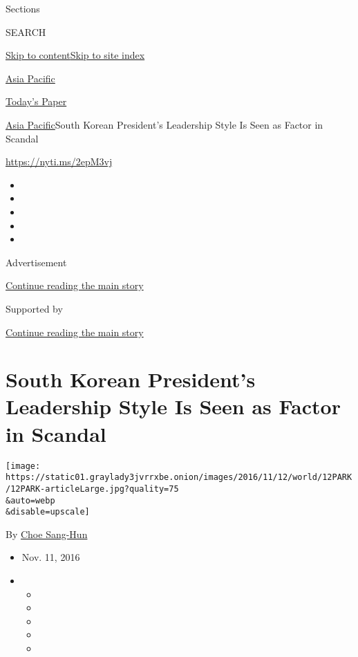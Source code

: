 Sections

SEARCH

\protect\hyperlink{site-content}{Skip to
content}\protect\hyperlink{site-index}{Skip to site index}

\href{https://www.nytimes3xbfgragh.onion/section/world/asia}{Asia
Pacific}

\href{https://myaccount.nytimes3xbfgragh.onion/auth/login?response_type=cookie\&client_id=vi}{}

\href{https://www.nytimes3xbfgragh.onion/section/todayspaper}{Today's
Paper}

\href{/section/world/asia}{Asia Pacific}\textbar{}South Korean
President's Leadership Style Is Seen as Factor in Scandal

\url{https://nyti.ms/2epM3vj}

\begin{itemize}
\item
\item
\item
\item
\item
\end{itemize}

Advertisement

\protect\hyperlink{after-top}{Continue reading the main story}

Supported by

\protect\hyperlink{after-sponsor}{Continue reading the main story}

\hypertarget{south-korean-presidents-leadership-style-is-seen-as-factor-in-scandal}{%
\section{South Korean President's Leadership Style Is Seen as Factor in
Scandal}\label{south-korean-presidents-leadership-style-is-seen-as-factor-in-scandal}}

\texttt{[image: https://static01.graylady3jvrrxbe.onion/images/2016/11/12/world/12PARK/12PARK-articleLarge.jpg?quality=75\\\&auto=webp\\\&disable=upscale]}

By \href{http://www.nytimes3xbfgragh.onion/by/choe-sang-hun}{Choe
Sang-Hun}

\begin{itemize}
\item
  Nov. 11, 2016
\item
  \begin{itemize}
  \item
  \item
  \item
  \item
  \item
  \end{itemize}
\end{itemize}

